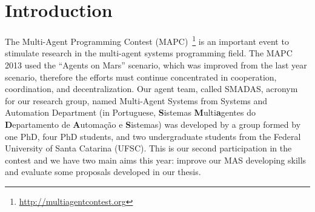 \section{Introduction}

The Multi-Agent Programming Contest (MAPC)~\cite{koster:2013}\footnote{\url{http://multiagentcontest.org}} is an important event to stimulate research in the multi-agent systems programming field. The MAPC 2013 used the ``Agents on Mars'' scenario, which was improved from the last year scenario, therefore the efforts must continue concentrated in cooperation, coordination, and decentralization. Our agent team, called SMADAS, acronym for our research group, named Multi-Agent Systems from Systems and Automation Department (in Portuguese, \textbf{S}istemas \textbf{M}ulti\textbf{a}gentes  do \textbf{D}epartamento de \textbf{A}utoma\c{c}\~ao e \textbf{S}istemas) was developed by a group formed by one PhD, four PhD students, and two undergraduate students from the Federal University of Santa Catarina (UFSC). This is our second participation in the contest and we have two main aims this year: improve our MAS developing skills and evaluate some proposals developed in our thesis. 

